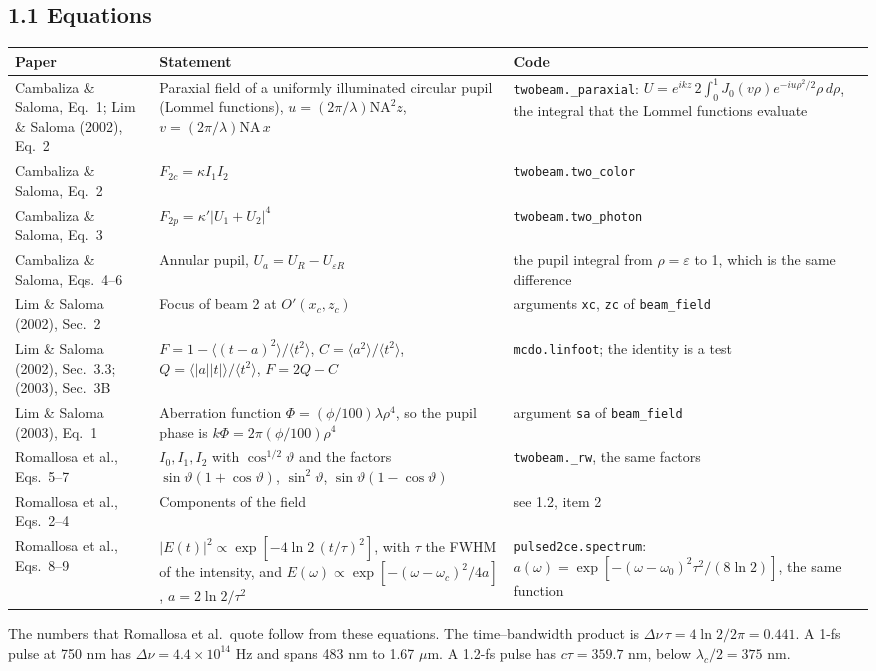\documentclass[10pt]{article}
\begin{document}
\subsection*{1.1 Equations}
\begin{center}\small\begin{tabular}{p{4.3cm}p{6.6cm}p{5.2cm}}\toprule
Paper & Statement & Code\\\midrule
Cambaliza \& Saloma, Eq.~1; Lim \& Saloma (2002), Eq.~2 & Paraxial field of a uniformly illuminated circular pupil
(Lommel functions), $u = (2\pi/\lambda)\mathrm{NA}^2 z$, $v = (2\pi/\lambda)\mathrm{NA}\,x$ &
\texttt{twobeam.\_paraxial}: $U = e^{ikz}\,2\!\int_0^1 J_0(v\rho)e^{-iu\rho^2/2}\rho\,d\rho$, the integral that the
Lommel functions evaluate\\
Cambaliza \& Saloma, Eq.~2 & $F_{2c} = \kappa I_1 I_2$ & \texttt{twobeam.two\_color}\\
Cambaliza \& Saloma, Eq.~3 & $F_{2p} = \kappa'|U_1 + U_2|^4$ & \texttt{twobeam.two\_photon}\\
Cambaliza \& Saloma, Eqs.~4--6 & Annular pupil, $U_a = U_R - U_{\varepsilon R}$ & the pupil integral from
$\rho = \varepsilon$ to 1, which is the same difference\\
Lim \& Saloma (2002), Sec.~2 & Focus of beam 2 at $O'(x_c, z_c)$ & arguments \texttt{xc}, \texttt{zc} of
\texttt{beam\_field}\\
Lim \& Saloma (2002), Sec.~3.3; (2003), Sec.~3B & $F = 1 - \langle(t-a)^2\rangle/\langle t^2\rangle$,
$C = \langle a^2\rangle/\langle t^2\rangle$, $Q = \langle|a||t|\rangle/\langle t^2\rangle$, $F = 2Q - C$ &
\texttt{mcdo.linfoot}; the identity is a test\\
Lim \& Saloma (2003), Eq.~1 & Aberration function $\Phi = (\phi/100)\lambda\rho^4$, so the pupil phase is
$k\Phi = 2\pi(\phi/100)\rho^4$ & argument \texttt{sa} of \texttt{beam\_field}\\
Romallosa et al., Eqs.~5--7 & $I_0, I_1, I_2$ with $\cos^{1/2}\vartheta$ and the factors $\sin\vartheta(1+\cos\vartheta)$,
$\sin^2\vartheta$, $\sin\vartheta(1-\cos\vartheta)$ & \texttt{twobeam.\_rw}, the same factors\\
Romallosa et al., Eqs.~2--4 & Components of the field & see 1.2, item 2\\
Romallosa et al., Eqs.~8--9 & $|E(t)|^2 \propto \exp[-4\ln 2\,(t/\tau)^2]$, with $\tau$ the FWHM of the intensity, and
$E(\omega) \propto \exp[-(\omega-\omega_c)^2/4a]$, $a = 2\ln 2/\tau^2$ & \texttt{pulsed2ce.spectrum}:
$a(\omega) = \exp[-(\omega-\omega_0)^2\tau^2/(8\ln 2)]$, the same function\\
\bottomrule\end{tabular}\end{center}
The numbers that Romallosa et al.\ quote follow from these equations. The time--bandwidth product is
$\Delta\nu\,\tau = 4\ln 2/2\pi = 0.441$. A 1-fs pulse at 750 nm has $\Delta\nu = 4.4\times10^{14}$ Hz and spans 483 nm to
1.67 $\mu$m. A 1.2-fs pulse has $c\tau = 359.7$ nm, below $\lambda_c/2 = 375$ nm.
\end{document}
